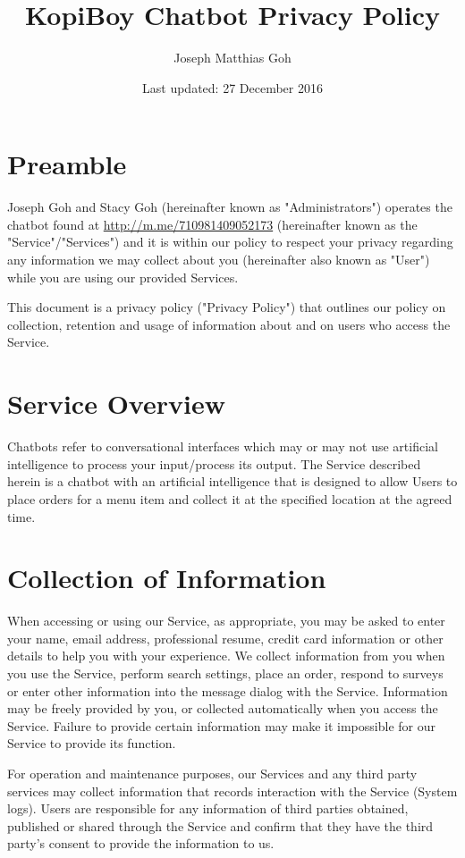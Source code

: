 \documentclass[11pt]{article}
\title{KopiBoy Chatbot Privacy Policy}
\author{Joseph Matthias Goh}
\date{Last updated: 27 December 2016}           %
\begin{document}
\setlength{\parskip}{12pt}
\maketitle



\section{Preamble}

Joseph Goh and Stacy Goh (hereinafter known as "Administrators") operates the 
chatbot found at \url{http://m.me/710981409052173} (hereinafter known as the "Service"/"Services") and it is within our policy 
to respect your privacy regarding any information we may collect about you (hereinafter 
also known as "User") while you are using our provided Services.

This document is a privacy policy ("Privacy Policy") that outlines our policy on
collection, retention and usage of information about and on users who access
the Service.

\section{Service Overview}

Chatbots refer to conversational interfaces which may or may not use artificial
intelligence to process your input/process its output. The Service described herein 
is a chatbot with an artificial intelligence that is designed to allow Users to place
orders for a menu item and collect it at the specified location at the agreed time.

\section{Collection of Information}

When accessing or using our Service, as appropriate, you may be asked to enter your
name, email address, professional resume, credit card information or other details to
help you with your experience. We collect information from you when you use the Service,
perform search settings, place an order, respond to surveys or enter other information
into the message dialog with the Service. Information may be freely provided by you, 
or collected automatically when you access the Service. Failure to provide certain 
information may make it impossible for our Service to provide its function.

For operation and maintenance purposes, our Services and any third party services may
collect information that records interaction with the Service (System logs). Users are
responsible for any information of third parties obtained, published or shared through
the Service and confirm that they have the third party's consent to provide the
information to us.
\end{document}
